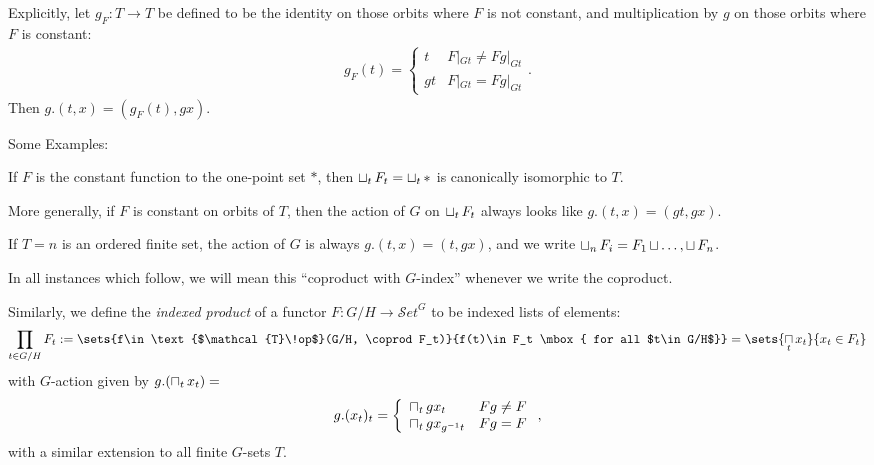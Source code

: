 \documentclass{report}
\renewenvironment{enumerate}%
{\begin{list}{\arabic{enumi}.}%
    {\itemsep=0in\usecounter{enumi}}%
  }{\end{list}}
\newcommand{\Top}{\text{$\mathcal{T}\!op$}}
\newcommand{\Set}{\text{$\mathcal{S}\!et$}}
\newcommand{\icap}{\operatornamewithlimits{\sqcap}}
\newcommand{\ico}{\operatornamewithlimits{\sqcup}}
\begin{document}
Explicitly, let $g_F: T\to T$ be defined to be the identity on those orbits where $F$ is not constant, and multiplication by $g$ on those orbits where $F$ is constant:
\begin{align}
\label{g_F}
g_F(t) = \left\{\begin{array}{lr}t & F|_{Gt} \neq Fg|_{Gt}\\ gt & F|_{Gt} = Fg|_{Gt}\end{array}\right. .
\end{align}
Then $g.(t,x) = (g_F(t), gx)$.

Some Examples:
\begin{enumerate}
\item If $F$ is the constant function to the one-point set $*$, then $\ico_t F_t = \ico_t*$ is canonically isomorphic to $T$.
\item More generally, if $F$ is constant on orbits of $T$, then the action of $G$ on $\ico_tF_t$ always looks like $g.(t,x) = (gt,gx)$.
\item If $T = n$ is an ordered finite set, the action of $G$ is always $g.(t,x) = (t,gx)$, and we write $\ico_nF_i = F_1\ico \ldots, \ico F_n$.
\end{enumerate}
In all instances which follow, we will mean this ``coproduct with $G$-index'' whenever we write the coproduct.

Similarly, we define the {\em indexed product} of a functor $F: G/H\to \Set^G$ to be indexed lists of elements: 
\[\prod_{t\in G/H}F_t := \sets{f\in\Top(G/H, \coprod F_t)}{f(t)\in F_t \mbox{ for all $t\in G/H$}} = \sets{\icap_tx_t}{x_t\in F_t}\]
with $G$-action given by $g.(\icap_tx_t) =$
\[g.(x_t)_t = \left\{\begin{array}{lr}\icap_tgx_t & Fg\neq F\\ \icap_tgx_{g^{-1}t} & Fg = F\end{array}\right. ,\]
with a similar extension to all finite $G$-sets $T$.
\end{document}
